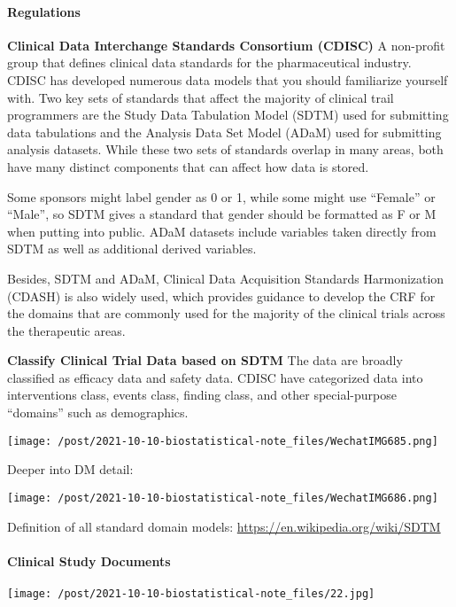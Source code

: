 \documentclass[
]{ctexart}
\begin{document}
\hypertarget{regulations}{%
\paragraph{Regulations}\label{regulations}}

\textbf{Clinical Data Interchange Standards Consortium (CDISC)} A
non-profit group that defines clinical data standards for the
pharmaceutical industry. CDISC has developed numerous data models that
you should familiarize yourself with. Two key sets of standards that
affect the majority of clinical trail programmers are the Study Data
Tabulation Model (SDTM) used for submitting data tabulations and the
Analysis Data Set Model (ADaM) used for submitting analysis datasets.
While these two sets of standards overlap in many areas, both have many
distinct components that can affect how data is stored.

Some sponsors might label gender as 0 or 1, while some might use
``Female'' or ``Male'', so SDTM gives a standard that gender should be
formatted as F or M when putting into public. ADaM datasets include
variables taken directly from SDTM as well as additional derived
variables.

Besides, SDTM and ADaM, Clinical Data Acquisition Standards
Harmonization (CDASH) is also widely used, which provides guidance to
develop the CRF for the domains that are commonly used for the majority
of the clinical trials across the therapeutic areas.

\textbf{Classify Clinical Trial Data based on SDTM} The data are broadly
classified as efficacy data and safety data. CDISC have categorized data
into interventions class, events class, finding class, and other
special-purpose ``domains'' such as demographics.

\texttt{[image: /post/2021-10-10-biostatistical-note\_files/WechatIMG685.png]}

Deeper into DM detail:

\texttt{[image: /post/2021-10-10-biostatistical-note\_files/WechatIMG686.png]}

Definition of all standard domain models:
\url{https://en.wikipedia.org/wiki/SDTM}

\hypertarget{clinical-study-documents}{%
\paragraph{Clinical Study Documents}\label{clinical-study-documents}}

\texttt{[image: /post/2021-10-10-biostatistical-note\_files/22.jpg]}
\end{document}
